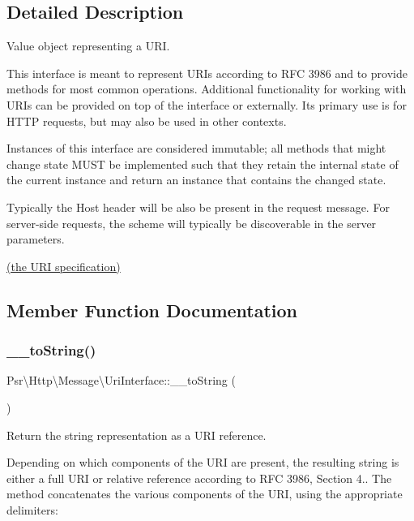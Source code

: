 \subsection{Detailed Description}
Value object representing a U\+RI.

This interface is meant to represent U\+R\+Is according to R\+FC 3986 and to provide methods for most common operations. Additional functionality for working with U\+R\+Is can be provided on top of the interface or externally. Its primary use is for H\+T\+TP requests, but may also be used in other contexts.

Instances of this interface are considered immutable; all methods that might change state M\+U\+ST be implemented such that they retain the internal state of the current instance and return an instance that contains the changed state.

Typically the Host header will be also be present in the request message. For server-\/side requests, the scheme will typically be discoverable in the server parameters.

\hyperlink{}{(the U\+RI specification) }

\subsection{Member Function Documentation}
\mbox{\label{interfacePsr_1_1Http_1_1Message_1_1UriInterface_a322566ef8139a72e4a3da1feffafb1e6}} 
\subsubsection{\texorpdfstring{\+\_\+\+\_\+to\+String()}{\_\_toString()}}
{\footnotesize\ttfamily Psr\textbackslash{}\+Http\textbackslash{}\+Message\textbackslash{}\+Uri\+Interface\+::\+\_\+\+\_\+to\+String (\begin{DoxyParamCaption}{ }\end{DoxyParamCaption})}

Return the string representation as a U\+RI reference.

Depending on which components of the U\+RI are present, the resulting string is either a full U\+RI or relative reference according to R\+FC 3986, Section 4.. The method concatenates the various components of the U\+RI, using the appropriate delimiters\+:


